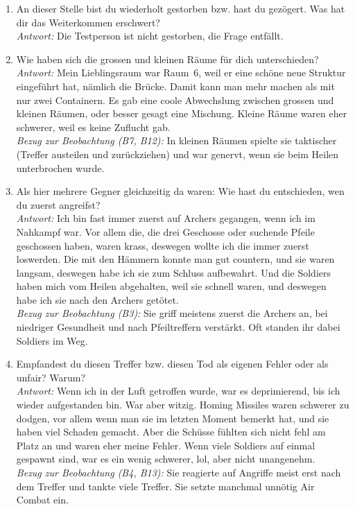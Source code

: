 \documentclass[../Main.tex]{subfiles}
\begin{document}
\begin{enumerate}[label=\textbf{I\arabic*}, leftmargin=1.5cm, itemsep=1em]
\item An dieser Stelle bist du wiederholt gestorben bzw. hast du gezögert. Was hat dir das Weiterkommen erschwert? \\
\textit{Antwort:} Die Testperson ist nicht gestorben, die Frage entfällt.

\item Wie haben sich die grossen und kleinen Räume für dich unterschieden? \\
\textit{Antwort:} Mein Lieblingsraum war Raum~6, weil er eine schöne neue Struktur eingeführt hat, nämlich die Brücke. Damit kann man mehr machen als mit nur zwei Containern. Es gab eine coole Abwechslung zwischen grossen und kleinen Räumen, oder besser gesagt eine Mischung. Kleine Räume waren eher schwerer, weil es keine Zuflucht gab. \\
\textit{Bezug zur Beobachtung (B7, B12):} In kleinen Räumen spielte sie taktischer (Treffer austeilen und zurückziehen) und war genervt, wenn sie beim Heilen unterbrochen wurde.

\item Als hier mehrere Gegner gleichzeitig da waren: Wie hast du entschieden, wen du zuerst angreifst? \\
\textit{Antwort:} Ich bin fast immer zuerst auf Archers gegangen, wenn ich im Nahkampf war. Vor allem die, die drei Geschosse oder suchende Pfeile geschossen haben, waren krass, deswegen wollte ich die immer zuerst loswerden. Die mit den Hämmern konnte man gut countern, und sie waren langsam, deswegen habe ich sie zum Schluss aufbewahrt. Und die Soldiers haben mich vom Heilen abgehalten, weil sie schnell waren, und deswegen habe ich sie nach den Archers getötet. \\
\textit{Bezug zur Beobachtung (B3):} Sie griff meistens zuerst die Archers an, bei niedriger Gesundheit und nach Pfeiltreffern verstärkt. Oft standen ihr dabei Soldiers im Weg.

\item Empfandest du diesen Treffer bzw. diesen Tod als eigenen Fehler oder als unfair? Warum? \\
\textit{Antwort:} Wenn ich in der Luft getroffen wurde, war es deprimierend, bis ich wieder aufgestanden bin. War aber witzig. Homing Missiles waren schwerer zu dodgen, vor allem wenn man sie im letzten Moment bemerkt hat, und sie haben viel Schaden gemacht. Aber die Schüsse fühlten sich nicht fehl am Platz an und waren eher meine Fehler. Wenn viele Soldiers auf einmal gespawnt sind, war es ein wenig schwerer, lol, aber nicht unangenehm. \\
\textit{Bezug zur Beobachtung (B4, B13):} Sie reagierte auf Angriffe meist erst nach dem Treffer und tankte viele Treffer. Sie setzte manchmal unnötig Air Combat ein.


\end{enumerate}
\end{document}
